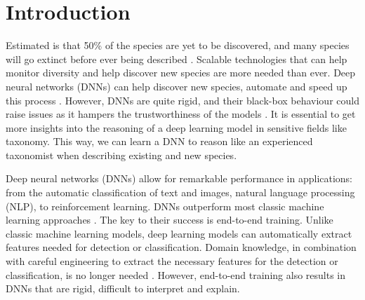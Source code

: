 \documentclass[a4paper, 12pt, oneside]{book} %
\begin{document}
\section{Introduction}
Estimated is that 50\% of the species are yet to be discovered, and many species will go extinct before ever being described \autocite{lees_species_2015}.
Scalable technologies that can help monitor diversity and help discover new species are more needed than ever.
Deep neural networks (DNNs) can help discover new species, automate and speed up this process \autocite{van_horn_inaturalist_2018}.
However, DNNs are quite rigid, and their black-box behaviour could raise issues as it hampers the trustworthiness of the models \autocite{carvalho_machine_2019}.
It is essential to get more insights into the reasoning of a deep learning model in sensitive fields like taxonomy.
This way, we can learn a DNN to reason like an experienced taxonomist when describing existing and new species.

Deep neural networks (DNNs) allow for remarkable performance in applications: from the automatic classification of text and images, natural language processing (NLP), to reinforcement learning.
DNNs outperform most classic machine learning approaches \autocite{he_delving_2015, brown_language_2020}.
The key to their success is end-to-end training.
Unlike classic machine learning models, deep learning models can automatically extract features needed for detection or classification.
Domain knowledge, in combination with careful engineering to extract the necessary features for the detection or classification, is no longer needed \autocite{lecun_deep_2015}.
However, end-to-end training also results in DNNs that are rigid, difficult to interpret and explain.

\end{document}
